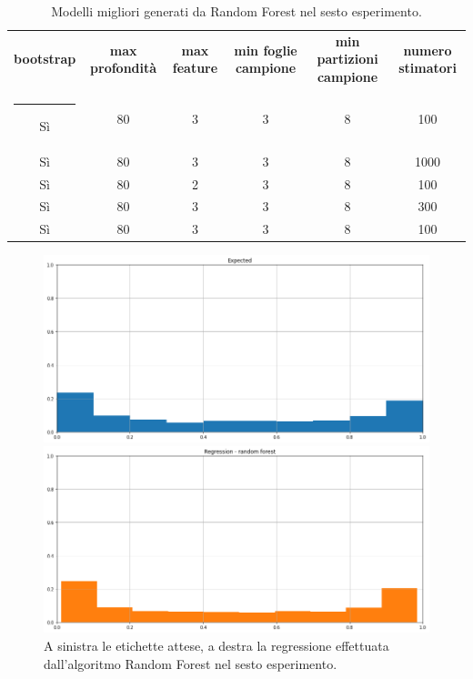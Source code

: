 \documentclass[12pt]{report}
\makeatletter
\theoremstyle{definition}
\newcommand{\thickhline}{%
    \noalign {\ifnum 0=`}\fi \hrule height 1pt
    \futurelet \reserved@a \@xhline
}
\makeatother
\begin{document}
\begin{table}
\centering
\begin{adjustbox}{max width=\textwidth}
 \begin{tabular}{|c|c|c|c|c|c|} 
 \hline
\textbf{bootstrap} & \textbf{max profondità} & \textbf{max feature} & \textbf{min foglie campione} & \textbf{min partizioni campione} & \textbf{numero stimatori}
\\ [0.5ex] 
 \thickhline
 Sì & 80 & 3 & 3 & 8 & 100 \\ 
 Sì & 80 & 3 & 3 & 8 & 1000 \\ 
 Sì & 80 & 2 & 3 & 8 & 100 \\ 
 Sì & 80 & 3 & 3 & 8 & 300 \\ 
 Sì & 80 & 3 & 3 & 8 & 100 \\ 
 \hline
\end{tabular}
\end{adjustbox}
\caption{Modelli migliori generati da Random Forest nel sesto esperimento.}
\label{models_rf_exp6}
\end{table}

\begin{figure}
\centering
    \begin{minipage}{0.48\textwidth}
        \includegraphics[width=\linewidth]{images/experiment_beta05_sovrapposti/expected_memberships.png}
    \end{minipage}
    \begin{minipage}{0.48\textwidth}
        \includegraphics[width=\linewidth]{images/experiment_beta05_sovrapposti/prediction_regression_rf.png}
    \end{minipage}
    \caption{A sinistra le etichette attese, a destra la regressione effettuata dall'algoritmo Random Forest nel sesto esperimento.}
    \label{rf_exp6}
\end{figure} 
\end{document}
